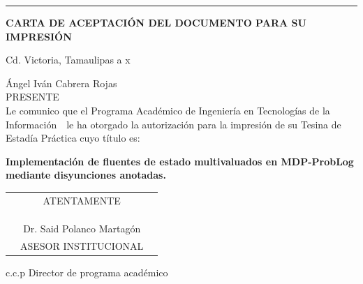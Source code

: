 \documentclass[12pt]{article}
\newcommand{\HRule}{\rule{\linewidth}{0.25mm}}
\newcommand{\ncarrera}            {Ingeniería en Tecnologías de la Información}
\newcommand{\nasesorinstitucional}{Dr. Said Polanco Martagón}
\newcommand{\NombreAlumno}{Ángel Iván Cabrera Rojas}
\newcommand{\NombreProyecto}{Implementación de fluentes de estado multivaluados en MDP-ProbLog mediante disyunciones anotadas.}
\newcommand{\fechacarta}{x}
\newcommand{\separacionCorta}{0.0cm}
\newcommand{\separacionLarga}{0.5cm}
\begin{document}
\HRule 



\clearpage
\thispagestyle{fancy}
\setcounter{page}{1}


\clearpage
\thispagestyle{fancy}


\clearpage
\thispagestyle{fancy}


\clearpage
{}
\thispagestyle{empty}

\vspace*{1.5cm}
\large

\begin{center}
\textbf{CARTA DE ACEPTACIÓN DEL DOCUMENTO PARA SU IMPRESIÓN}\\[\separacionLarga]
\end{center}

\begin{flushright}
Cd. Victoria, Tamaulipas a \fechacarta \\[\separacionLarga]
\end{flushright}

\parindent=0mm

\NombreAlumno \\
PRESENTE \\[\separacionCorta]

Le comunico que  el Programa Académico de \ncarrera\ \ le ha otorgado la autorización para la impresión de su Tesina de Estadía Práctica cuyo título es: \\[\separacionCorta]

\begin{center}
\textbf{\NombreProyecto} \\[\separacionLarga]
\end{center}

\begin{center}	
\begin{tabular}{ccc}
\centering
& ATENTAMENTE & \\ 
& & \\
& & \\
& & \\ \hline
& \nasesorinstitucional & \\
& ASESOR INSTITUCIONAL & \\
\end{tabular}
\end{center} 
\vspace{2cm}
c.c.p Director de programa académico
\end{document}
